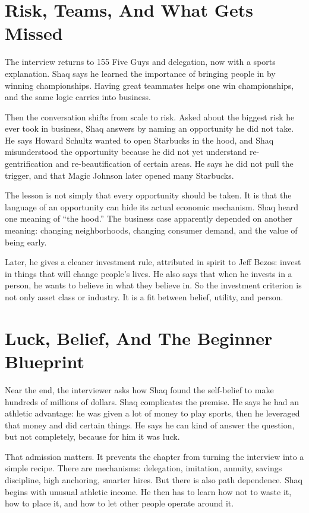 \section{Risk, Teams, And What Gets Missed}

The interview returns to 155 Five Guys and delegation, now with a sports explanation. Shaq says he learned the importance of bringing people in by winning championships. Having great teammates helps one win championships, and the same logic carries into business.

Then the conversation shifts from scale to risk. Asked about the biggest risk he ever took in business, Shaq answers by naming an opportunity he did not take. He says Howard Schultz wanted to open Starbucks in the hood, and Shaq misunderstood the opportunity because he did not yet understand re-gentrification and re-beautification of certain areas. He says he did not pull the trigger, and that Magic Johnson later opened many Starbucks.

The lesson is not simply that every opportunity should be taken. It is that the language of an opportunity can hide its actual economic mechanism. Shaq heard one meaning of ``the hood.'' The business case apparently depended on another meaning: changing neighborhoods, changing consumer demand, and the value of being early.

Later, he gives a cleaner investment rule, attributed in spirit to Jeff Bezos: invest in things that will change people's lives. He also says that when he invests in a person, he wants to believe in what they believe in. So the investment criterion is not only asset class or industry. It is a fit between belief, utility, and person.

\section{Luck, Belief, And The Beginner Blueprint}

Near the end, the interviewer asks how Shaq found the self-belief to make hundreds of millions of dollars. Shaq complicates the premise. He says he had an athletic advantage: he was given a lot of money to play sports, then he leveraged that money and did certain things. He says he can kind of answer the question, but not completely, because for him it was luck.

That admission matters. It prevents the chapter from turning the interview into a simple recipe. There are mechanisms: delegation, imitation, annuity, savings discipline, high anchoring, smarter hires. But there is also path dependence. Shaq begins with unusual athletic income. He then has to learn how not to waste it, how to place it, and how to let other people operate around it.

